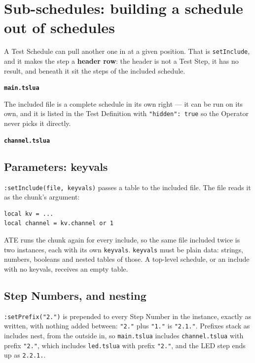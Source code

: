 \chapter{Sub-schedules: building a schedule out of schedules}\label{ch:sub-schedules}

A Test Schedule can pull another one in at a given position. That is \texttt{setInclude}, and
it makes the step a \textbf{header row}: the header is not a Test Step, it has no result, and
beneath it sit the steps of the included schedule.

\noindent\textbf{\texttt{main.tslua}}\par


The included file is a complete schedule in its own right --- it can be run on its own, and it
is listed in the Test Definition with \texttt{"hidden": true} so the Operator never picks it
directly.

\noindent\textbf{\texttt{channel.tslua}}\par


\section{Parameters: keyvals}

\texttt{:setInclude(file, keyvals)} passes a table to the included file. The file reads it as
the chunk's argument:

\begingroup\footnotesize
\begin{verbatim}
local kv = ...
local channel = kv.channel or 1
\end{verbatim}
\endgroup

ATE runs the chunk again for every include, so the same file included twice is two instances,
each with its own \texttt{keyvals}. \texttt{keyvals} must be plain data: strings, numbers,
booleans and nested tables of those. A top-level schedule, or an include with no keyvals,
receives an empty table.

\section{Step Numbers, and nesting}

\texttt{:setPrefix("2.")} is prepended to every Step Number in the instance, exactly as
written, with nothing added between: \texttt{"2."} plus \texttt{"1."} is \texttt{"2.1."}.
Prefixes stack as includes nest, from the outside in, so \texttt{main.tslua} includes
\texttt{channel.tslua} with prefix \texttt{"2."}, which includes \texttt{led.tslua} with prefix
\texttt{"2."}, and the LED step ends up as \texttt{2.2.1.}.

